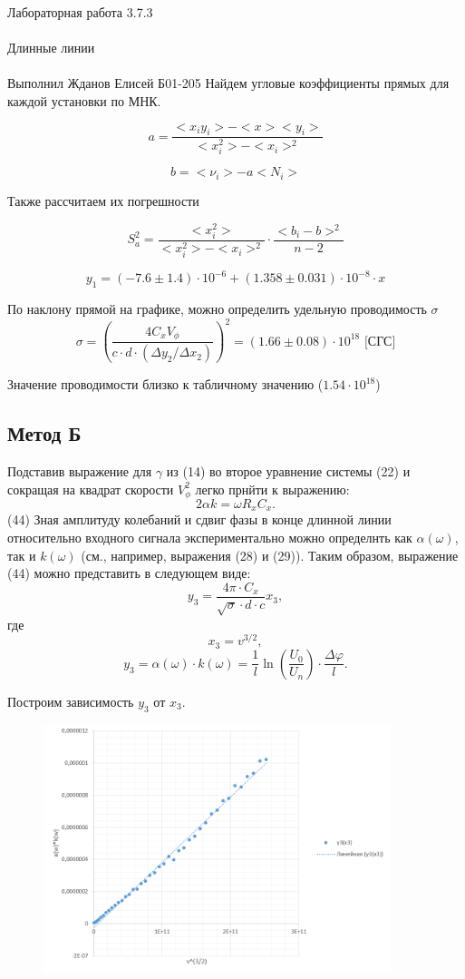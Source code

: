 \documentclass{astroedu-lab}
\begin{document}
\begin{problem}{\huge Лабораторная работа 3.7.3\\\\Длинные линии\\\\Выполнил Жданов Елисей Б01-205}
Найдем угловые коэффициенты прямых для каждой установки по МНК.

\[
	a = \frac{<x_i y_i> - < x > < y_i >}{< x_i^2> - < x_i >^2}
\]

\[
	b = < \nu_i > - a < N_i >
\]

Также рассчитаем их погрешности

\begin{equation}
	S_a^2 = \frac{< x_i^2>}{< x_i^2 > - < x_i >^2} \cdot \frac{<  b_i - b > ^2}{n - 2}
\end{equation}

\begin{equation}
	y_1 = (-7.6 \pm 1.4) \cdot 10^{-6} + (1.358 \pm 0.031) \cdot 10^{-8} \cdot x
\end{equation}

По наклону прямой на графике, можно определить удельную проводимость $\sigma$
$$
\sigma=\left(\frac{4 C_x V_\phi}{c \cdot d \cdot\left(\Delta y_2 / \Delta x_2\right)}\right)^2 = (1.66 \pm 0.08) \cdot 10^{18} \text{ [СГС]}
$$

Значение проводимости близко к табличному значению ($1.54 \cdot 10^{18}$)

\subsection{Метод Б}

Подставив выражение для $\gamma$ из (14) во второе уравнение системы (22) и сокращая на квадрат скорости $V_\phi^2$ легко прнйти к выражению:
$$
2 \alpha k=\omega R_x C_x .
$$
(44)
Зная амплитуду колебаний и сдвиг фазы в конце длинной линии относительно входного сигнала экспериментально можно определнть как $\alpha(\omega)$, так и $k(\omega)$ (см., например, выражения (28) и (29)). Таким образом, выражение (44) можно представить в следующем виде:
$$
y_3=\frac{4 \pi \cdot C_x}{\sqrt{\sigma} \cdot d \cdot c} x_3,
$$
где
$$
x_3=v^{3 / 2},
$$
$$
y_3=\alpha(\omega) \cdot k(\omega)=\frac{1}{l} \ln \left(\frac{U_0}{U_n}\right) \cdot \frac{\Delta \varphi}{l} .
$$

Построим зависимость $y_3$ от $x_3$.

\begin{figure}[!h]
	\centering
	\includegraphics[width=0.9\textwidth]{граф3.png}
	\label{fig:boiler}
\end{figure}



\end{problem}
\end{document}

